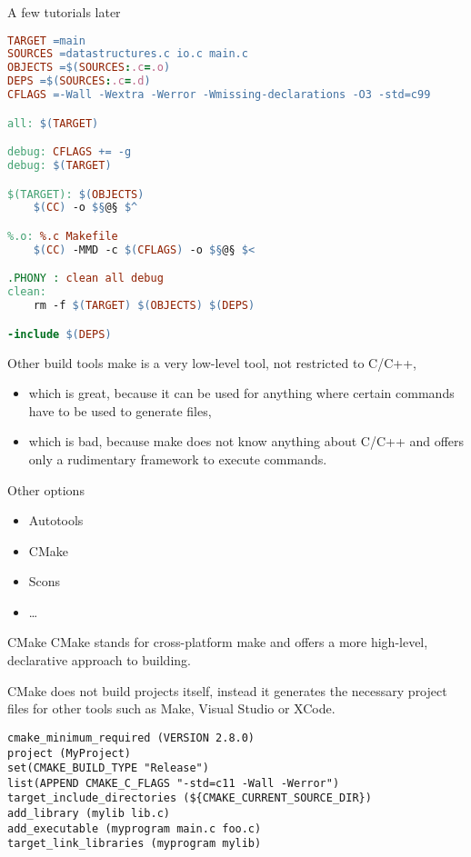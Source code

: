 \begin{frame}[fragile]{A few tutorials later}
	\begin{lstlisting}[language=make,basicstyle=\tiny,escapeinside=§]
TARGET =main
SOURCES =datastructures.c io.c main.c
OBJECTS =$(SOURCES:.c=.o)
DEPS =$(SOURCES:.c=.d)
CFLAGS =-Wall -Wextra -Werror -Wmissing-declarations -O3 -std=c99

all: $(TARGET)

debug: CFLAGS += -g
debug: $(TARGET)

$(TARGET): $(OBJECTS)
	$(CC) -o $§@§ $^

%.o: %.c Makefile
	$(CC) -MMD -c $(CFLAGS) -o $§@§ $<

.PHONY : clean all debug
clean:
	rm -f $(TARGET) $(OBJECTS) $(DEPS)

-include $(DEPS)
\end{lstlisting}
\end{frame}

\begin{frame}{Other build tools}
	make is a very low-level tool, not restricted to C/C++,
	\begin{itemize}
	  \item which is great, because it can be used for anything where certain commands have to be used to generate files,
	  \item which is bad, because make does not know anything about C/C++ and offers only a rudimentary framework to execute commands.
	\end{itemize}

	Other options
	\begin{itemize}
	  \item Autotools
	  \item CMake
	  \item Scons
	  \item …
	\end{itemize}
\end{frame}

\begin{frame}[fragile]{CMake}
	CMake stands for cross-platform make and offers a more high-level, declarative approach to building.

	CMake does not build projects itself, instead it generates the necessary project files for other tools such as Make, Visual Studio or XCode.

	\begin{lstlisting}[escapeinside=§]
cmake_minimum_required (VERSION 2.8.0)
project (MyProject)
set(CMAKE_BUILD_TYPE "Release")
list(APPEND CMAKE_C_FLAGS "-std=c11 -Wall -Werror")
target_include_directories (${CMAKE_CURRENT_SOURCE_DIR})
add_library (mylib lib.c)
add_executable (myprogram main.c foo.c)
target_link_libraries (myprogram mylib)
\end{lstlisting}
\end{frame}

